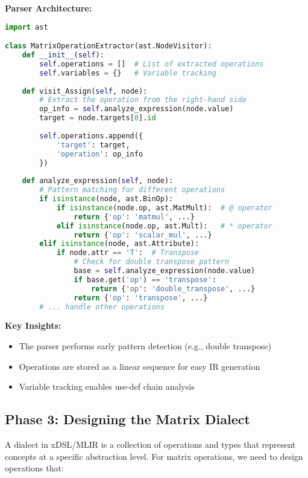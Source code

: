\documentclass[11pt,a4paper]{article}
\begin{document}
\textbf{Parser Architecture:}
\begin{lstlisting}[language=Python, caption=Parser structure and key methods]
import ast

class MatrixOperationExtractor(ast.NodeVisitor):
    def __init__(self):
        self.operations = []  # List of extracted operations
        self.variables = {}   # Variable tracking
    
    def visit_Assign(self, node):
        # Extract the operation from the right-hand side
        op_info = self.analyze_expression(node.value)
        target = node.targets[0].id
        
        self.operations.append({
            'target': target,
            'operation': op_info
        })
    
    def analyze_expression(self, node):
        # Pattern matching for different operations
        if isinstance(node, ast.BinOp):
            if isinstance(node.op, ast.MatMult):  # @ operator
                return {'op': 'matmul', ...}
            elif isinstance(node.op, ast.Mult):   # * operator
                return {'op': 'scalar_mul', ...}
        elif isinstance(node, ast.Attribute):
            if node.attr == 'T':  # Transpose
                # Check for double transpose pattern
                base = self.analyze_expression(node.value)
                if base.get('op') == 'transpose':
                    return {'op': 'double_transpose', ...}
                return {'op': 'transpose', ...}
        # ... handle other operations
\end{lstlisting}

\textbf{Key Insights:}
\begin{itemize}
    \item The parser performs early pattern detection (e.g., double transpose)
    \item Operations are stored as a linear sequence for easy IR generation
    \item Variable tracking enables use-def chain analysis
\end{itemize}

\subsection{Phase 3: Designing the Matrix Dialect}

A dialect in xDSL/MLIR is a collection of operations and types that represent concepts at a specific abstraction level. For matrix operations, we need to design operations that:
\end{document}
